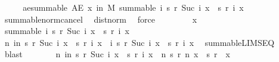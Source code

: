\begin{isabellebody}
\ \ \isamarkupfalse%
\ \isamarkupfalse%
\ ae{\isacharunderscore}{\kern0pt}summable{\isacharcolon}{\kern0pt}\ {\isachardoublequoteopen}AE\ x\ in\ M{\isachardot}{\kern0pt}\ summable\ {\isacharparenleft}{\kern0pt}{\isasymlambda}i{\isachardot}{\kern0pt}\ s\ {\isacharparenleft}{\kern0pt}r\ {\isacharparenleft}{\kern0pt}Suc\ i{\isacharparenright}{\kern0pt}{\isacharparenright}{\kern0pt}\ x\ {\isacharminus}{\kern0pt}\ s\ {\isacharparenleft}{\kern0pt}r\ i{\isacharparenright}{\kern0pt}\ x{\isacharparenright}{\kern0pt}{\isachardoublequoteclose}\ \isamarkupfalse%
\ summable{\isacharunderscore}{\kern0pt}norm{\isacharunderscore}{\kern0pt}cancel\ \isamarkupfalse%
\ dist{\isacharunderscore}{\kern0pt}norm\ \isamarkupfalse%
\ force\isanewline
\isanewline
\ \ \isacommand{{\isacharbraceleft}{\kern0pt}}\isamarkupfalse%
\isanewline
\ \ \ \ \isamarkupfalse%
\ x\ \isamarkupfalse%
\ {\isachardoublequoteopen}summable\ {\isacharparenleft}{\kern0pt}{\isasymlambda}i{\isachardot}{\kern0pt}\ s\ {\isacharparenleft}{\kern0pt}r\ {\isacharparenleft}{\kern0pt}Suc\ i{\isacharparenright}{\kern0pt}{\isacharparenright}{\kern0pt}\ x\ {\isacharminus}{\kern0pt}\ s\ {\isacharparenleft}{\kern0pt}r\ i{\isacharparenright}{\kern0pt}\ x{\isacharparenright}{\kern0pt}{\isachardoublequoteclose}\isanewline
\ \ \ \ \isamarkupfalse%
\ {\isachardoublequoteopen}{\isacharparenleft}{\kern0pt}{\isasymlambda}n{\isachardot}{\kern0pt}\ {\isasymSum}i{\isacharless}{\kern0pt}n{\isachardot}{\kern0pt}\ s\ {\isacharparenleft}{\kern0pt}r\ {\isacharparenleft}{\kern0pt}Suc\ i{\isacharparenright}{\kern0pt}{\isacharparenright}{\kern0pt}\ x\ {\isacharminus}{\kern0pt}\ s\ {\isacharparenleft}{\kern0pt}r\ i{\isacharparenright}{\kern0pt}\ x{\isacharparenright}{\kern0pt}\ {\isasymlonglonglongrightarrow}\ {\isacharparenleft}{\kern0pt}{\isasymSum}i{\isachardot}{\kern0pt}\ s\ {\isacharparenleft}{\kern0pt}r\ {\isacharparenleft}{\kern0pt}Suc\ i{\isacharparenright}{\kern0pt}{\isacharparenright}{\kern0pt}\ x\ {\isacharminus}{\kern0pt}\ s\ {\isacharparenleft}{\kern0pt}r\ i{\isacharparenright}{\kern0pt}\ x{\isacharparenright}{\kern0pt}{\isachardoublequoteclose}\ \isamarkupfalse%
\ summable{\isacharunderscore}{\kern0pt}LIMSEQ\ \isamarkupfalse%
\ blast\isanewline
\ \ \ \ \isamarkupfalse%
\ \isamarkupfalse%
\ {\isachardoublequoteopen}{\isacharparenleft}{\kern0pt}{\isasymlambda}n{\isachardot}{\kern0pt}\ {\isacharparenleft}{\kern0pt}{\isasymSum}i{\isacharless}{\kern0pt}n{\isachardot}{\kern0pt}\ s\ {\isacharparenleft}{\kern0pt}r\ {\isacharparenleft}{\kern0pt}Suc\ i{\isacharparenright}{\kern0pt}{\isacharparenright}{\kern0pt}\ x\ {\isacharminus}{\kern0pt}\ s\ {\isacharparenleft}{\kern0pt}r\ i{\isacharparenright}{\kern0pt}\ x{\isacharparenright}{\kern0pt}{\isacharparenright}{\kern0pt}\ {\isacharequal}{\kern0pt}\ {\isacharparenleft}{\kern0pt}{\isasymlambda}n{\isachardot}{\kern0pt}\ s\ {\isacharparenleft}{\kern0pt}r\ n{\isacharparenright}{\kern0pt}\ x\ {\isacharminus}{\kern0pt}\ s\ {\isacharparenleft}{\kern0pt}r\ {}{\isacharparenright}{\kern0pt}\ x{\isacharparenright}{\kern0pt}{\isachardoublequoteclose}\ \isamarkupfalse%

\end{isabellebody}
